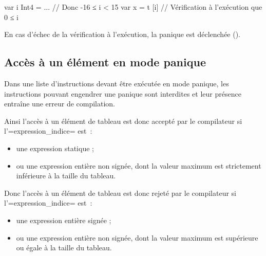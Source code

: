 \begin{OMNIBUS}
var i Int4 = ... // Donc -16 ≤ i < 15
var x = t [i] // Vérification à l'exécution que 0 ≤ i
\end{OMNIBUS}

En cas d'échec de la vérification à l'exécution, la panique est déclenchée ().

\subsection{Accès à un élément en mode panique}

Dans une liste d'instructions devant être exécutée en mode panique, les instructions pouvant engendrer une panique sont interdites et leur présence entraîne une erreur de compilation.

Ainsi l'accès à un élément de tableau est donc accepté par le compilateur si l'\omnibus=expression_indice= est~:
\begin{itemize}
\item une expression statique ;
\item ou une expression entière non signée, dont la valeur maximum est strictement inférieure à la taille du tableau.
\end{itemize}


Donc l'accès à un élément de tableau est donc rejeté par le compilateur si l'\omnibus=expression_indice= est~:
\begin{itemize}
\item une expression entière signée ;
\item ou une expression entière non signée, dont la valeur maximum est supérieure ou égale à la taille du tableau.
\end{itemize}


